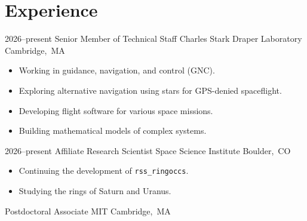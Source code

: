 \documentclass[letterpaper,sans]{moderncv}
\begin{document}
    \section{Experience}
        \cventry%
            {2026--present}
            {Senior Member of Technical Staff}
            {Charles Stark Draper Laboratory}
            {\newline\mbox{Cambridge, MA}}
            {}
            {%
                \begin{itemize}
                    \item
                        Working in guidance, navigation, and control (GNC).
                    \item
                        Exploring alternative navigation using stars
                        for GPS-denied spaceflight.
                    \item
                        Developing flight software for various space missions.
                    \item
                        Building mathematical models of complex systems.
                \end{itemize}
            }
        \cventry%
            {2026--present}
            {Affiliate Research Scientist}
            {Space Science Institute}
            {\mbox{Boulder, CO}}
            {}
            {%
                \begin{itemize}
                    \item
                        Continuing the development of \texttt{rss\_ringoccs}.
                    \item
                        Studying the rings of Saturn and Uranus.
                \end{itemize}
            }
            {Postdoctoral Associate}
            {MIT}
            {\mbox{Cambridge, MA}}
            {}
\end{document}
